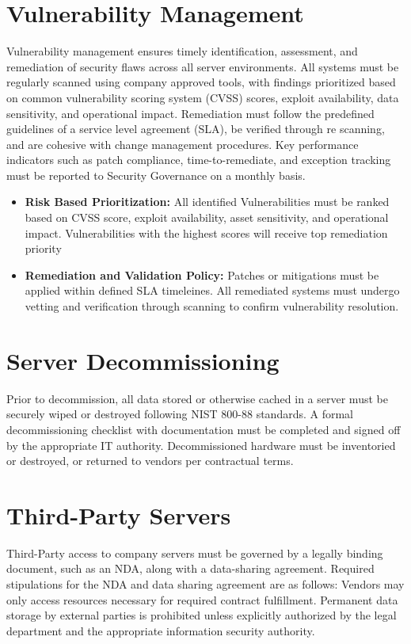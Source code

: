 \section{Vulnerability Management}
Vulnerability management ensures timely identification, assessment, and remediation of security flaws across all server environments. All systems must be regularly scanned using company approved tools, with findings prioritized based on common vulnerability scoring system (CVSS) scores, exploit availability, data sensitivity, and operational impact. Remediation must follow the predefined guidelines of a service level agreement (SLA), be verified through re scanning, and are cohesive with change management procedures. Key performance indicators such as patch compliance, time-to-remediate, and exception tracking must be reported to Security Governance on a monthly basis.
\begin{itemize}
    \item \textbf{Risk Based Prioritization:}
    All identified Vulnerabilities must be ranked based on CVSS score, exploit availability, asset sensitivity, and operational impact. Vulnerabilities with the highest scores will receive top remediation priority
    \item \textbf{Remediation and Validation Policy:}
    Patches or mitigations must be applied within defined SLA timeleines. All remediated systems must undergo vetting and verification through scanning to confirm vulnerability resolution.
\end{itemize}
\section{Server Decommissioning}
Prior to decommission, all data stored or otherwise cached in a server must be securely wiped or destroyed following NIST 800-88 standards. A formal decommissioning checklist with documentation must be completed and signed off by the appropriate IT authority. Decommissioned hardware must be inventoried or destroyed, or returned to vendors per contractual terms.

\section{Third-Party Servers}
Third-Party access to company servers must be governed by a legally binding document, such as an NDA, along with a data-sharing agreement. Required stipulations for the NDA and data sharing agreement are as follows: Vendors may only access resources necessary for required contract fulfillment. Permanent data storage by external parties is prohibited unless explicitly authorized by the legal department and the appropriate information security authority.

